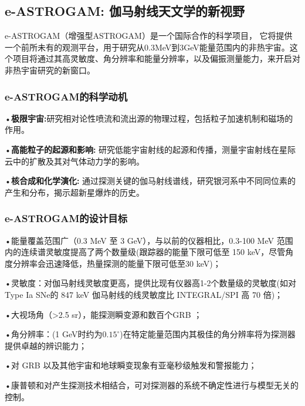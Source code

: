 \subsection{e-ASTROGAM: 伽马射线天文学的新视野}
e-ASTROGAM（增强型ASTROGAM）是一个国际合作的科学项目，
    它将提供一个前所未有的观测平台，用于研究从0.3MeV到3GeV能量范围内的非热宇宙。这个项目将通过其高灵敏度、角分辨率和能量分辨率，以及偏振测量能力，来开启对
    非热宇宙研究的新窗口。

\subsubsection{e-ASTROGAM的科学动机}
•\textbf{极限宇宙:}研究相对论性喷流和流出源的物理过程，包括粒子加速机制和磁场的作用。\par
•\textbf{高能粒子的起源和影响: }研究低能宇宙射线的起源和传播，测量宇宙射线在星际云中的扩散及其对气体动力学的影响。\par
•\textbf{核合成和化学演化: }通过探测关键的伽马射线谱线，研究银河系中不同同位素的产生和分布，揭示超新星爆炸的历史。\par
\subsubsection{e-ASTROGAM的设计目标}
•能量覆盖范围广（0.3 MeV 至 3 GeV），与以前的仪器相比，0.3-100 MeV 范围内的连续谱灵敏度提高了两个数量级(跟踪器的能量下限可低至 150 keV，尽管角度分辨率会迅速降低，热量探测的能量下限可低至30 keV)；\par
•灵敏度：对伽马射线灵敏度更高，提供比现有仪器高1-2个数量级的灵敏度(如对Type Ia SNe的 847 keV 伽马射线的线灵敏度比 INTEGRAL/SPI 高 70 倍)；\par
•大视场角（>2.5 sr），能探测瞬变源和数百个GRB ；\par
•角分辨率：(1 GeV时约为$0.15^{\circ}$)在特定能量范围内其极佳的角分辨率将为探测器提供卓越的辨识能力；\par
•对 GRB 以及其他宇宙和地球瞬变现象有亚毫秒级触发和警报能力；\par
•康普顿和对产生探测技术相结合，可对探测器的系统不确定性进行与模型无关的控制。
